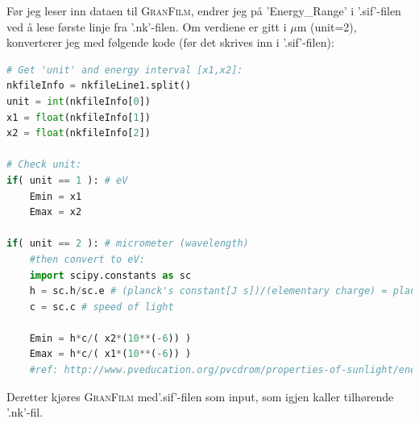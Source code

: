Før jeg leser inn dataen til \textsc{GranFilm}, endrer jeg på 'Energy\_Range' i '.sif'-filen ved å 
lese første linje fra '.nk'-filen. Om verdiene er gitt i $\mu$m (unit=2), konverterer 
jeg med følgende kode (før det skrives inn i '.sif'-filen):
\begin{lstlisting}[style=FormattedNumber, language=python]
# Get 'unit' and energy interval [x1,x2]:
nkfileInfo = nkfileLine1.split()
unit = int(nkfileInfo[0])
x1 = float(nkfileInfo[1])
x2 = float(nkfileInfo[2])

# Check unit:
if( unit == 1 ): # eV
    Emin = x1
    Emax = x2

if( unit == 2 ): # micrometer (wavelength)
    #then convert to eV:
    import scipy.constants as sc
    h = sc.h/sc.e # (planck's constant[J s])/(elementary charge) = planck[eV s]
    c = sc.c # speed of light

    Emin = h*c/( x2*(10**(-6)) )
    Emax = h*c/( x1*(10**(-6)) )
    #ref: http://www.pveducation.org/pvcdrom/properties-of-sunlight/energy-of-photon
\end{lstlisting}
Deretter kjøres \textsc{GranFilm} med'.sif'-filen som input, som igjen kaller tilhørende '.nk'-fil.




